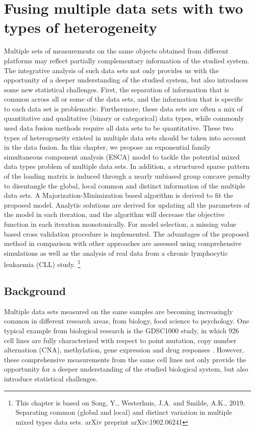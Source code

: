 \chapter{Fusing multiple data sets with two types of heterogeneity} \label{chapter:5}
Multiple sets of measurements on the same objects obtained from different
platforms may reflect partially complementary information of the studied system. The
integrative analysis of such data sets not only provides us with the opportunity of
a deeper understanding of the studied system, but also introduces some new
statistical challenges. First, the separation of information that is common
across all or some of the data sets, and the information that is specific to
each data set is problematic. Furthermore, these data sets are often a mix of
quantitative and qualitative (binary or categorical) data types, while commonly used data
fusion methods require all data sets to be quantitative. These two types of heterogeneity existed in multiple data sets should be taken into account in the data fusion. In this chapter, we propose an exponential family simultaneous component analysis (ESCA) model
to tackle the potential mixed data types problem of multiple data sets. In
addition, a structured sparse pattern of the loading matrix is induced through a
nearly unbiased group concave penalty to disentangle the global, local
common and distinct information of the multiple data sets. A Majorization-Minimization based algorithm is derived to fit the proposed model. Analytic solutions are derived for updating all the parameters of the model in each iteration, and the algorithm will decrease the objective function in each iteration monotonically. For model selection, a missing value based cross validation procedure is implemented. The advantages of the proposed method in comparison with other approaches are assessed using comprehensive simulations as well as the analysis of real data from a chronic lymphocytic leukaemia (CLL) study.
\footnote{This chapter is based on Song, Y., Westerhuis, J.A. and Smilde, A.K., 2019. Separating common (global and local) and distinct variation in multiple mixed types data sets. arXiv preprint arXiv:1902.06241}

\section{Background} \label{section:5.1}
Multiple data sets measured on the same samples are becoming increasingly common in different research areas, from biology, food science to psychology. One typical example from biological research is the GDSC1000 study, in which 926 cell lines are fully characterized with respect to point mutation, copy number alternation (CNA), methylation, gene expression and drug responses \cite{iorio2016landscape}. However, these comprehensive measurements from the same cell lines not only provide the opportunity for a deeper understanding of the studied biological system, but also introduce statistical challenges.

